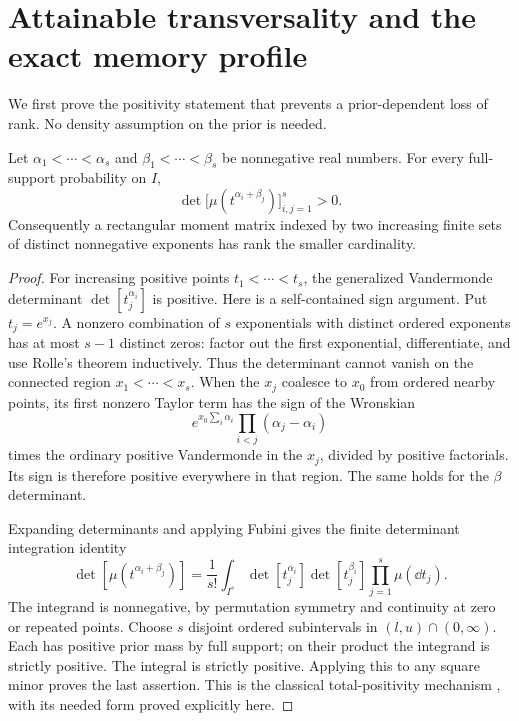 \section{Attainable transversality and the exact memory profile}\label{sec:rank}
We first prove the positivity statement that prevents a prior-dependent
loss of rank. No density assumption on the prior is needed.

\begin{lemma}\label{lem:mixed-moment}
Let $\alpha_1<\cdots<\alpha_s$ and $\beta_1<\cdots<\beta_s$ be
nonnegative real numbers. For every full-support probability on $I$,
\begin{equation}\label{eq:mixed-minor}
 \det\bigl[\mu(t^{\alpha_i+\beta_j})\bigr]_{i,j=1}^s>0.
\end{equation}
Consequently a rectangular moment matrix indexed by two increasing finite
sets of distinct nonnegative exponents has rank the smaller cardinality.
\end{lemma}
\begin{proof}
For increasing positive points $t_1<\cdots<t_s$, the generalized
Vandermonde determinant $\det[t_j^{\alpha_i}]$ is positive. Here is a
self-contained sign argument. Put $t_j=e^{x_j}$. A nonzero combination
of $s$ exponentials with distinct ordered exponents has at most $s-1$
distinct zeros: factor out the first exponential, differentiate, and use
Rolle's theorem inductively. Thus the determinant cannot vanish on the
connected region $x_1<\cdots<x_s$. When the $x_j$ coalesce to $x_0$
from ordered nearby points, its first nonzero Taylor term has the sign
of the Wronskian
\[
 e^{x_0\sum_i\alpha_i}\prod_{i<j}(\alpha_j-\alpha_i)
\]
times the ordinary positive Vandermonde in the $x_j$, divided by
positive factorials. Its sign is therefore positive everywhere in that
region. The same holds for the $\beta$ determinant.

Expanding determinants and applying Fubini gives the finite determinant
integration identity
\[
 \det[\mu(t^{\alpha_i+\beta_j})]
 =\frac1{s!}\int_{I^s}
       \det[t_j^{\alpha_i}]\det[t_j^{\beta_i}]
       \prod_{j=1}^s\mu(\dd t_j).
\]
The integrand is nonnegative, by permutation symmetry and continuity at
zero or repeated points. Choose $s$ disjoint ordered subintervals in
$(l,u)\cap(0,\infty)$. Each has positive prior mass by full support;
on their product the integrand is strictly positive. The integral is
strictly positive. Applying this to any square minor proves the last
assertion. This is the classical total-positivity mechanism
\cite{Pinkus}, with its needed form proved explicitly here.
\end{proof}


